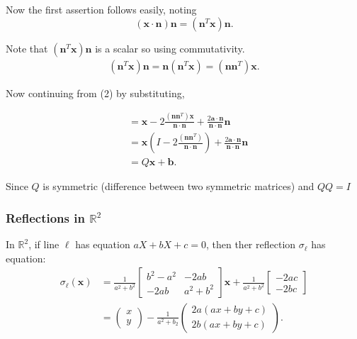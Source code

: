 Now the first assertion follows easily, noting
\[
  (\mathbf{x} \cdot \mathbf{n})\mathbf{n} = \left(\mathbf{n}^{T} \mathbf{x}  \right) \mathbf{n} 
.\] 

Note that \( (\mathbf{n}^{T} \mathbf{x}) \mathbf{n} \) is a scalar so using commutativity.
\begin{align*}
  \left(\mathbf{n}^{T} \mathbf{x}  \right) \mathbf{n} = \mathbf{n} \left(\mathbf{n}^{T} \mathbf{x}  \right) = \left(\mathbf{n} \mathbf{n}^{T}  \right) \mathbf{x}
.\end{align*}

Now continuing from (2) by substituting,

\begin{align*}
  &= \mathbf{x} - 2 \frac{(\mathbf{n} \mathbf{n}^{T})\mathbf{x}}{\mathbf{n} \cdot \mathbf{n}} + \frac{2 \mathbf{a} \cdot \mathbf{n}}{\mathbf{n} \cdot \mathbf{n}} \mathbf{n} \\
  &= \mathbf{x} \left( I - 2 \frac{(\mathbf{n} \mathbf{n}^{T})}{\mathbf{n} \cdot \mathbf{n}}   \right) + \frac{2 \mathbf{a} \cdot \mathbf{n}}{\mathbf{n} \cdot \mathbf{n}} \mathbf{n} \\
  &=  Q \mathbf{x} + \mathbf{b}
.\end{align*}

Since \( Q  \) is symmetric (difference between two symmetric matrices) and \( Q Q = I \) 

\subsubsection{Reflections in \( \mathbb{R}^{2} \)}

\begin{corollary}
 In \( \mathbb{R}^{2} \), if line \( \ell \) has equation \( aX + bX + c = 0 \), then ther 
 reflection \( \sigma_{\ell} \) has equation:
 \begin{align*}
   \sigma_{\ell}\left(\mathbf{x}  \right) &= \frac{1}{a^2 + b^2} \begin{bmatrix} b^{2} - a^{2} & -2ab \\ -2ab & a^2 + b^2 \end{bmatrix} \mathbf{x} + \frac{1}{a^2 + b^2} \begin{bmatrix} -2ac \\ -2bc \end{bmatrix}  \\
                                          &= \begin{pmatrix} x \\ y \end{pmatrix} - \frac{1}{a^2 + b_{2}} \begin{pmatrix} 2a \left( ax + by + c \right) \\ 2b \left(ax + by + c  \right) \end{pmatrix} 
 .\end{align*}

\end{corollary}

